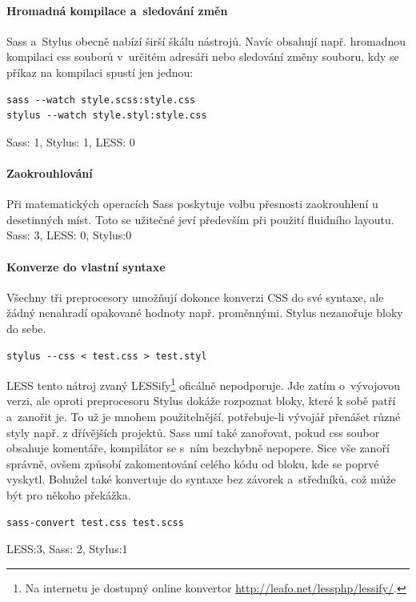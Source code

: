 \documentclass[thesis=B,czech]{FITthesis}[2012/06/26]
\begin{document}
\paragraph{Hromadná kompilace a~sledování změn}

 \gls{Sass} a~Stylus obecně nabízí širší škálu nástrojů. Navíc obsahují např. hromadnou kompilaci css souborů v~určitém adresáři nebo sledování změny souboru, kdy se příkaz na kompilaci spustí jen jednou:
\scriptsize
\begin{verbatim}
sass --watch style.scss:style.css
stylus --watch style.styl:style.css
\end{verbatim}
\normalsize
\gls{Sass}: 1, Stylus: 1, LESS: 0

\paragraph{Zaokrouhlování}

 Při matematických operacích \gls{Sass} poskytuje volbu přesnosti zaokrouhlení u desetinných míst. Toto se užitečné jeví především při použití fluidního layoutu.
\gls{Sass}: 3, LESS: 0, Stylus:0
\paragraph{Konverze do vlastní syntaxe}

 Všechny tři preprocesory umožňují dokonce konverzi \gls{CSS} do své syntaxe, ale žádný nenahradí opakované hodnoty např. proměnnými. Stylus nezanořuje bloky do sebe.
\scriptsize
\begin{verbatim}
stylus --css < test.css > test.styl
\end{verbatim}
\normalsize
LESS tento nátroj zvaný LESSify\footnote{Na internetu je dostupný online konvertor \url{http://leafo.net/lessphp/lessify/}.} oficálně nepodporuje. Jde zatím o~vývojovou verzi, ale oproti preprocesoru Stylus dokáže rozpoznat bloky, které k sobě patří a~zanořit je. To už je mnohem použitelnější, potřebuje-li vývojář přenášet různé styly např. z dřívějších projektů. 
\gls{Sass} umí také zanořovat, pokud css soubor obsahuje komentáře, kompilátor se s~ním bezchybně nepopere. Sice vše zanoří správně, ovšem způsobí zakomentování celého kódu od bloku, kde se poprvé vyskytl. Bohužel také konvertuje do syntaxe bez závorek a~středníků, což může být pro někoho překážka. 

\scriptsize
\begin{verbatim}
sass-convert test.css test.scss
\end{verbatim}
\normalsize
LESS:3, \gls{Sass}: 2, Stylus:1
\end{document}
